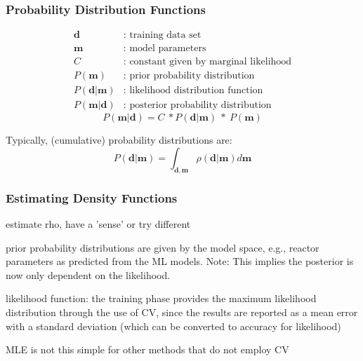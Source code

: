 
\begin{frame}
  \frametitle{Probability Distribution Functions}
  \begin{align*}
    \boldsymbol{d} &\text{: training data set}\\
    \boldsymbol{m} &\text{: model parameters}\\
    C &\text{: constant given by marginal likelihood}\\
    P(\boldsymbol{m}) &\text{: prior probability distribution}\\
    P(\boldsymbol{d}|\boldsymbol{m}) &\text{: likelihood distribution function}\\
    P(\boldsymbol{m}|\boldsymbol{d}) &\text{: posterior probability distribution}
  \end{align*}
  $$ P(\boldsymbol{m}|\boldsymbol{d}) = C\ * P(\boldsymbol{d}|\boldsymbol{m})\ *\ P(\boldsymbol{m}) $$
  
  Typically, (cumulative) probability distributions are:
  $$ P(\boldsymbol{d}|\boldsymbol{m}) = \int_{\boldsymbol{d}, \boldsymbol{m}} \rho(\boldsymbol{d}|\boldsymbol{m}) d\boldsymbol{m} $$
\end{frame}

\begin{frame}
  \frametitle{Estimating Density Functions}
  estimate rho, have a 'sense' or try different 

  prior probability distributions are given by the model space, e.g., reactor
  parameters as predicted from the ML models. \cite{bayes_compare} 
  Note: This implies the posterior is now only dependent on the likelihood.

  likelihood function: the training phase provides the maximum likelihood
  distribution through the use of CV, since the results are reported as a
  mean error with a standard deviation (which can be converted to accuracy for
  likelihood) \cite{scikit}

  MLE is not this simple for other methods that do not employ CV \cite{gentle_bayes, bayes_compare}
\end{frame}


